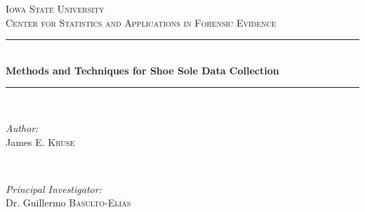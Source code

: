 \graphicspath{ {images/} }

\usepackage{hyperref}



\begin{titlepage}

\newcommand{\HRule}{\rule{\linewidth}{0.5mm}} %

\center %
 
\textsc{\LARGE Iowa State University}\\[1.5cm] %
\textsc{\large Center for Statistics and Applications in Forensic Evidence }\\[0.5cm] %


\HRule \\[0.4cm]
{ \huge \bfseries Methods and Techniques for Shoe Sole Data Collection}\\[0.4cm] %
\HRule \\[1.5cm]
 
\begin{minipage}{0.4\textwidth}
\begin{flushleft} \large
\emph{Author:}\\
James \textsc{E. Kruse} %
\end{flushleft}
\end{minipage}
~
\begin{minipage}{0.4\textwidth}
\begin{flushright} \large
\emph{Principal Investigator:} \\
Dr. Guillermo \textsc{Basulto-Elias} %
\end{flushright}
\end{minipage}\\[2cm]


\end{titlepage}
